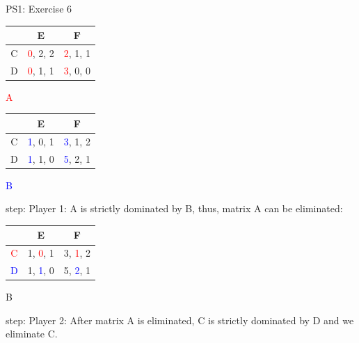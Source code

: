 \begin{frame}{PS1: Exercise 6}
\begin{multicols}{2}
\begin{table}
  \begin{tabular}{c|c|c}
      & E       & F       \\
    \midrule
    C & \textcolor{red}{0}, 2, 2 & \textcolor{red}{2}, 1, 1 \\
    \midrule
    D & \textcolor{red}{0}, 1, 1 & \textcolor{red}{3}, 0, 0
  \end{tabular}
  \center \textcolor{red}{A}
\end{table}
\columnbreak
\begin{table}
  \begin{tabular}{c|c|c}
      & E       & F       \\
    \midrule
    C & \textcolor{blue}{1}, 0, 1 & \textcolor{blue}{3}, 1, 2 \\
    \midrule
    D & \textcolor{blue}{1}, 1, 0 & \textcolor{blue}{5}, 2, 1
  \end{tabular}
  \center \textcolor{blue}{B}
\end{table}
\end{multicols}
 step: Player 1: A is strictly dominated by B, thus, matrix A can be eliminated:
\begin{multicols}{2}
\vfill\null
\columnbreak
\begin{table}
  \begin{tabular}{c|c|c}
      & E       & F       \\
    \midrule
    \textcolor{red}{C} & 1, \textcolor{red}{0}, 1 & 3, \textcolor{red}{1}, 2 \\
    \midrule
    \textcolor{blue}{D} & 1, \textcolor{blue}{1}, 0 & 5, \textcolor{blue}{2}, 1
  \end{tabular}
  \center B
\end{table}
\end{multicols}
 step: Player 2: After matrix A is eliminated, C is strictly dominated by D and we eliminate C.
\end{frame}

